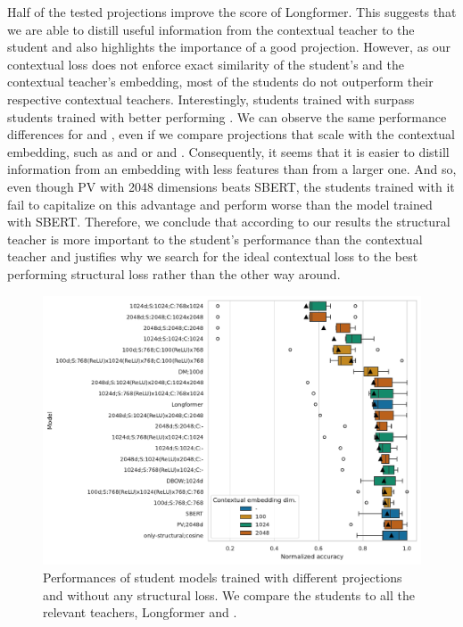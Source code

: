 Half of the tested projections improve the score of Longformer. This suggests
that we are able to distill useful information from the contextual teacher to
the student and also highlights the importance of a good projection. However,
as our contextual loss does not enforce exact similarity of the student's and
the contextual teacher's embedding, most of the students do not outperform
their respective contextual teachers. Interestingly, students trained with
 surpass students trained with better performing
. We can observe the same performance differences for
 and , even if we compare projections that
scale with the contextual embedding, such as  and
 or  and
. Consequently, it seems that it is easier to distill
information from an embedding with less features than from a larger one. And
so, even though PV with 2048 dimensions beats SBERT, the students trained with
it fail to capitalize on this advantage and perform worse than the model
trained with SBERT. Therefore, we conclude that according to our results the
structural teacher is more important to the student's performance than the
contextual teacher and justifies why we search for the ideal contextual loss to
the best performing structural loss rather than the other way around.

\begin{figure}

  \centering

  \includegraphics[width=\textwidth]{img/projections_contextual.pdf}

  \caption{Performances of student models trained with different projections
  and without any structural loss. We compare the students to all the relevant
  teachers, Longformer and .}

  \label{fig:projections_contextual}

\end{figure}

